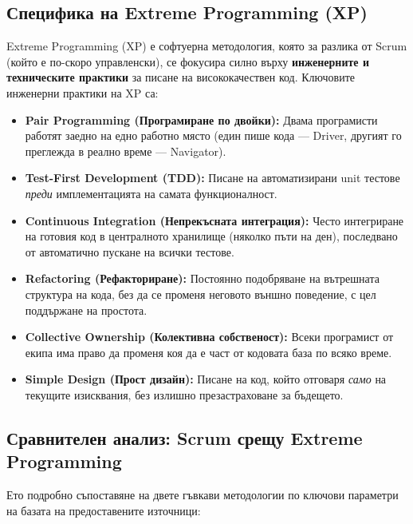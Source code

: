 \documentclass{scrartcl}
\begin{document}
\begin{FlushLeft}
\subsection{Специфика на Extreme Programming (XP)}
Extreme Programming (XP) е софтуерна методология, която за разлика от Scrum (който е по-скоро управленски), се фокусира силно върху \textbf{инженерните и техническите практики} за писане на висококачествен код.
Ключовите инженерни практики на XP са:
\begin{itemize}
    \item \textbf{Pair Programming (Програмиране по двойки):} Двама програмисти работят заедно на едно работно място (един пише кода — Driver, другият го преглежда в реално време — Navigator).
    \item \textbf{Test-First Development (TDD):} Писане на автоматизирани unit тестове \emph{преди} имплементацията на самата функционалност.
    \item \textbf{Continuous Integration (Непрекъсната интеграция):} Често интегриране на готовия код в централното хранилище (няколко пъти на ден), последвано от автоматично пускане на всички тестове.
    \item \textbf{Refactoring (Рефакториране):} Постоянно подобряване на вътрешната структура на кода, без да се променя неговото външно поведение, с цел поддържане на простота.
    \item \textbf{Collective Ownership (Колективна собственост):} Всеки програмист от екипа има право да променя коя да е част от кодовата база по всяко време.
    \item \textbf{Simple Design (Прост дизайн):} Писане на код, който отговаря \emph{само} на текущите изисквания, без излишно презастраховане за бъдещето.
\end{itemize}

\subsection{Сравнителен анализ: Scrum срещу Extreme Programming}
Ето подробно съпоставяне на двете гъвкави методологии по ключови параметри на базата на предоставените източници:


\end{FlushLeft}
\end{document}
